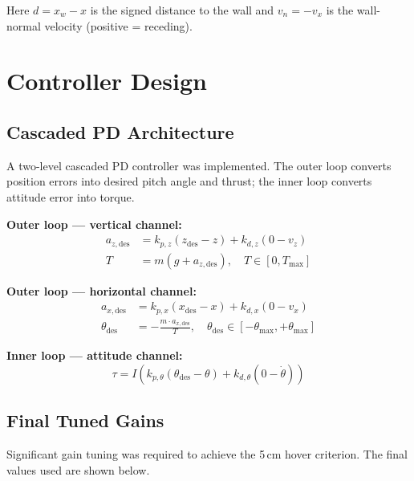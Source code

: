 \documentclass[12pt]{article}
\begin{document}
Here $d = x_w - x$ is the signed distance to the wall and
$v_n = -v_x$ is the wall-normal velocity (positive = receding).

\section{Controller Design}

\subsection{Cascaded PD Architecture}

A two-level cascaded PD controller was implemented. The outer loop
converts position errors into desired pitch angle and thrust; the inner
loop converts attitude error into torque.

\textbf{Outer loop --- vertical channel:}
\begin{align}
    a_{z,\mathrm{des}} &= k_{p,z}(z_\mathrm{des} - z) + k_{d,z}(0 - v_z) \\
    T &= m(g + a_{z,\mathrm{des}}), \quad T \in [0, T_\mathrm{max}]
\end{align}

\textbf{Outer loop --- horizontal channel:}
\begin{align}
    a_{x,\mathrm{des}} &= k_{p,x}(x_\mathrm{des} - x) + k_{d,x}(0 - v_x) \\
    \theta_\mathrm{des} &= -\frac{m \cdot a_{x,\mathrm{des}}}{T},
    \quad \theta_\mathrm{des} \in [-\theta_\mathrm{max}, +\theta_\mathrm{max}]
\end{align}

\textbf{Inner loop --- attitude channel:}
\begin{equation}
    \tau = I\left(k_{p,\theta}(\theta_\mathrm{des} - \theta)
    + k_{d,\theta}(0 - \dot{\theta})\right)
\end{equation}

\subsection{Final Tuned Gains}

Significant gain tuning was required to achieve the 5\,cm hover criterion.
The final values used are shown below.
\end{document}
